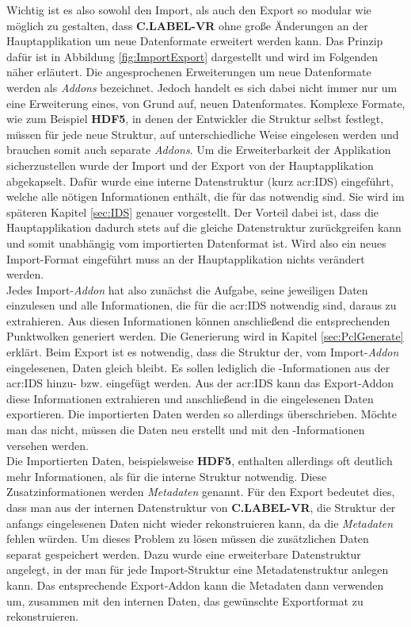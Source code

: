 Wichtig ist es also sowohl den Import, als auch den Export so modular wie möglich zu gestalten, dass \textbf{C.LABEL-VR} ohne große Änderungen  an der Hauptapplikation um neue Datenformate erweitert werden kann. Das Prinzip  dafür ist in Abbildung \ref{fig:ImportExport} dargestellt und wird im Folgenden näher erläutert. Die angesprochenen Erweiterungen um neue Datenformate werden als \textit{Addons} bezeichnet. Jedoch handelt es sich dabei nicht immer nur um eine Erweiterung eines, von Grund auf, neuen Datenformates. Komplexe Formate, wie zum Beispiel \textbf{HDF5}, in denen der Entwickler die Struktur selbst festlegt, müssen für jede neue Struktur, auf unterschiedliche Weise eingelesen werden und brauchen somit auch separate \textit{Addons}. Um die Erweiterbarkeit der Applikation sicherzustellen wurde der Import und der Export von der Hauptapplikation \glqq abgekapselt\grqq . Dafür wurde eine interne Datenstruktur (kurz \acrshort{acr:IDS}) eingeführt, welche alle nötigen Informationen enthält, die für das  notwendig sind. Sie wird im späteren Kapitel \ref{sec:IDS} genauer vorgestellt. Der Vorteil dabei ist, dass die Hauptapplikation dadurch stets auf die gleiche Datenstruktur zurückgreifen kann und somit unabhängig vom importierten Datenformat ist. Wird also ein neues Import-Format eingeführt muss an der Hauptapplikation nichts verändert werden. \\ 

Jedes Import-\textit{Addon} hat also zunächst die Aufgabe, seine jeweiligen Daten einzulesen und alle Informationen, die für die \acrshort{acr:IDS} notwendig sind, daraus zu extrahieren. Aus diesen Informationen können anschließend die entsprechenden Punktwolken generiert werden. Die Generierung wird in Kapitel \ref{sec:PclGenerate} erklärt. Beim Export ist es notwendig, dass die Struktur der, vom Import-\textit{Addon} eingelesenen, Daten gleich bleibt. Es sollen lediglich die -Informationen aus der \acrshort{acr:IDS} hinzu- bzw. eingefügt werden. Aus der \acrshort{acr:IDS} kann das Export-Addon diese Informationen extrahieren und anschließend in die eingelesenen Daten exportieren. Die importierten Daten werden so allerdings überschrieben. Möchte man das nicht, müssen die Daten neu erstellt und mit den -Informationen versehen werden. \\

Die Importierten Daten, beispielsweise \textbf{HDF5}, enthalten allerdings oft deutlich mehr Informationen, als für die interne Struktur notwendig. Diese Zusatzinformationen werden \textit{Metadaten} genannt. Für den Export bedeutet dies, dass man aus der internen Datenstruktur von \textbf{C.LABEL-VR}, die Struktur der anfangs eingelesenen Daten nicht wieder rekonstruieren kann, da die \textit{Metadaten} fehlen würden. Um dieses Problem zu lösen müssen die zusätzlichen Daten separat gespeichert werden. Dazu wurde eine erweiterbare Datenstruktur angelegt, in der man für jede Import-Struktur eine Metadatenstruktur anlegen kann. Das entsprechende Export-Addon kann die Metadaten dann verwenden um, zusammen mit den internen Daten, das gewünschte Exportformat zu rekonstruieren. \\

